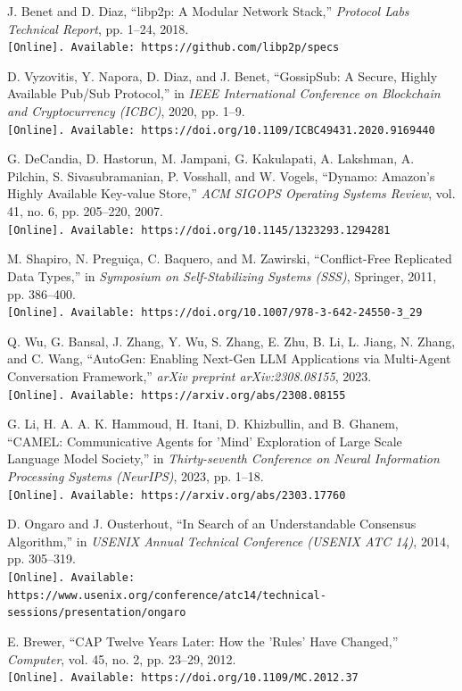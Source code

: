\documentclass[12pt,a4paper]{report}
\begin{document}
\vspace{8pt}\noindent
[3] J. Benet and D. Diaz, “libp2p: A Modular Network Stack,” \textit{Protocol Labs Technical Report}, pp. 1--24, 2018. \\
\texttt{[Online]. Available: https://github.com/libp2p/specs}

\vspace{8pt}\noindent
[4] D. Vyzovitis, Y. Napora, D. Diaz, and J. Benet, “GossipSub: A Secure, Highly Available Pub/Sub Protocol,” in \textit{IEEE International Conference on Blockchain and Cryptocurrency (ICBC)}, 2020, pp. 1--9. \\
\texttt{[Online]. Available: https://doi.org/10.1109/ICBC49431.2020.9169440}

\vspace{8pt}\noindent
[5] G. DeCandia, D. Hastorun, M. Jampani, G. Kakulapati, A. Lakshman, A. Pilchin, S. Sivasubramanian, P. Vosshall, and W. Vogels, “Dynamo: Amazon’s Highly Available Key-value Store,” \textit{ACM SIGOPS Operating Systems Review}, vol. 41, no. 6, pp. 205--220, 2007. \\
\texttt{[Online]. Available: https://doi.org/10.1145/1323293.1294281}

\vspace{8pt}\noindent
[6] M. Shapiro, N. Preguiça, C. Baquero, and M. Zawirski, “Conflict-Free Replicated Data Types,” in \textit{Symposium on Self-Stabilizing Systems (SSS)}, Springer, 2011, pp. 386--400. \\
\texttt{[Online]. Available: https://doi.org/10.1007/978-3-642-24550-3\_29}

\vspace{8pt}\noindent
[7] Q. Wu, G. Bansal, J. Zhang, Y. Wu, S. Zhang, E. Zhu, B. Li, L. Jiang, N. Zhang, and C. Wang, “AutoGen: Enabling Next-Gen LLM Applications via Multi-Agent Conversation Framework,” \textit{arXiv preprint arXiv:2308.08155}, 2023. \\
\texttt{[Online]. Available: https://arxiv.org/abs/2308.08155}

\vspace{8pt}\noindent
[8] G. Li, H. A. A. K. Hammoud, H. Itani, D. Khizbullin, and B. Ghanem, “CAMEL: Communicative Agents for 'Mind' Exploration of Large Scale Language Model Society,” in \textit{Thirty-seventh Conference on Neural Information Processing Systems (NeurIPS)}, 2023, pp. 1--18. \\
\texttt{[Online]. Available: https://arxiv.org/abs/2303.17760}

\vspace{8pt}\noindent
[9] D. Ongaro and J. Ousterhout, “In Search of an Understandable Consensus Algorithm,” in \textit{USENIX Annual Technical Conference (USENIX ATC 14)}, 2014, pp. 305--319. \\
\texttt{[Online]. Available: https://www.usenix.org/conference/atc14/technical-sessions/presentation/ongaro}

\vspace{8pt}\noindent
[10] E. Brewer, “CAP Twelve Years Later: How the 'Rules' Have Changed,” \textit{Computer}, vol. 45, no. 2, pp. 23--29, 2012. \\
\texttt{[Online]. Available: https://doi.org/10.1109/MC.2012.37}
\end{document}
